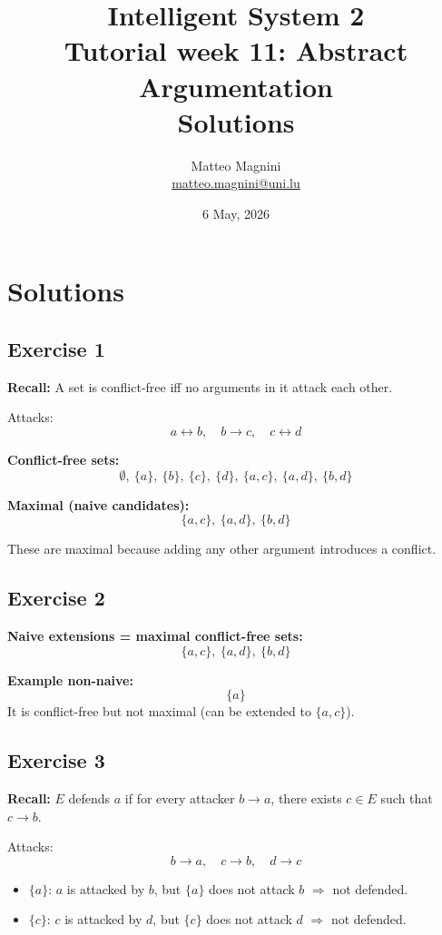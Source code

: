 \documentclass[11pt]{article}
\title{
    Intelligent System 2\\
    Tutorial week 11: Abstract Argumentation\\
    \textbf{Solutions}
}
\author{
    Matteo Magnini\\
    \href{mailto:matteo.magnini@uni.lu}{matteo.magnini@uni.lu}
}
\date{
    6 May, 2026
}
\begin{document}
\maketitle

\section{Solutions}

\subsection{Exercise 1}

\textbf{Recall:} A set is conflict-free iff no arguments in it attack each other.

Attacks:
\[
a \leftrightarrow b,\quad b \to c,\quad c \leftrightarrow d
\]

\textbf{Conflict-free sets:}
\[
\emptyset,\ \{a\},\ \{b\},\ \{c\},\ \{d\},\ \{a,c\},\ \{a,d\},\ \{b,d\}
\]

\textbf{Maximal (naive candidates):}
\[
\{a,c\},\ \{a,d\},\ \{b,d\}
\]

These are maximal because adding any other argument introduces a conflict.

\subsection{Exercise 2}

\textbf{Naive extensions = maximal conflict-free sets:}
\[
\{a,c\},\ \{a,d\},\ \{b,d\}
\]

\textbf{Example non-naive:}
\[
\{a\}
\]
It is conflict-free but not maximal (can be extended to $\{a,c\}$).

\subsection{Exercise 3}

\textbf{Recall:} $E$ defends $a$ if for every attacker $b \to a$, there exists $c \in E$ such that $c \to b$.

Attacks:
\[
b \to a,\quad c \to b,\quad d \to c
\]

\begin{itemize}
    \item $\{a\}$:
    $a$ is attacked by $b$, but $\{a\}$ does not attack $b$ $\Rightarrow$ not defended.

    \item $\{c\}$:
    $c$ is attacked by $d$, but $\{c\}$ does not attack $d$ $\Rightarrow$ not defended.
\end{itemize}
\end{document}

